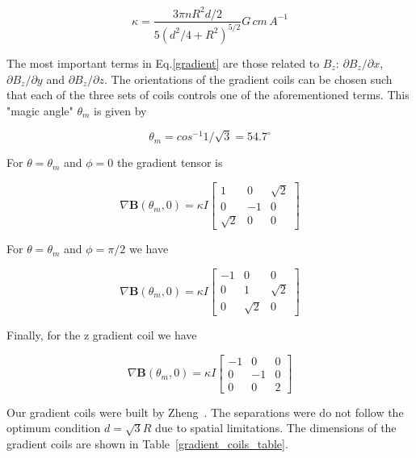 \begin{equation}
\kappa = \frac{3\pi n R^2 d/2}{5(d^2/4+R^2)^{5/2}}G\,cm\,A^{-1}
\end{equation}

The most important terms in Eq.\ref{gradient} are those related to $B_z$: $\partial B_z/\partial x$, $\partial B_z/\partial y$ and $\partial B_z/\partial z$. The orientations of the gradient coils can be chosen such that each of the three sets of coils controls one of the aforementioned terms. This "magic angle" $\theta_m$ is given by

\begin{equation}
\theta_m = cos^{-1}1/\sqrt{3}=54.7^{\circ}
\end{equation}

For $\theta=\theta_m$ and $\phi=0$ the gradient tensor is

\begin{equation}
\nabla\boldsymbol{B}(\theta_m, 0)=\kappa I
\begin{bmatrix}
1 & 0 & \sqrt{2}\\
0 & -1 & 0 \\
\sqrt{2} & 0 & 0
\end{bmatrix}
\end{equation}

For $\theta=\theta_m$ and $\phi=\pi/2$ we have

\begin{equation}
\nabla\boldsymbol{B}(\theta_m, 0)=\kappa I
\begin{bmatrix}
-1 & 0 & 0\\
0 & 1 & \sqrt{2}\\
0 & \sqrt{2} & 0
\end{bmatrix}
\end{equation}

Finally, for the z gradient coil we have

\begin{equation}
\nabla\boldsymbol{B}(\theta_m, 0)=\kappa I
\begin{bmatrix}
-1 & 0 & 0\\
0 & -1 & 0\\
0 & 0 & 2
\end{bmatrix}
\end{equation}

Our gradient coils were built by Zheng~\cite{YuanThesis}. The separations were do not follow the optimum condition $d=\sqrt{3}R$ due to spatial limitations. The dimensions of the gradient coils are shown in Table~\ref{gradient_coils_table}.

